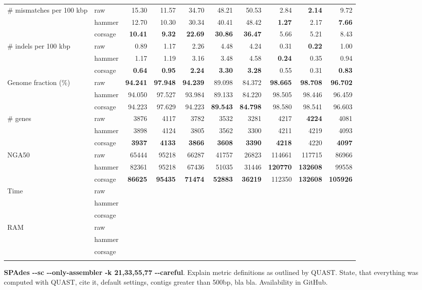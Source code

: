 \documentclass{bioinfo2}
\begin{document}
\begin{table}[p]
{\begin{tabular}{llrrrrrrrr}
\midrule
\# mismatches per 100 kbp & raw     & 15.30 & 11.57 & 34.70 & 48.21 & 50.53 & 2.84 & \textbf{2.14} & 9.72 \\
                          & hammer  & 12.70 & 10.30 & 30.34 & 40.41 & 48.42 & \textbf{1.27} & 2.17 & \textbf{7.66} \\
                          & corsage & \textbf{10.41} &  \textbf{9.32} & \textbf{22.69} & \textbf{30.86} & \textbf{36.47} & 5.66 & 5.21 & 8.43 \\
\midrule
\# indels per 100 kbp & raw     & 0.89 & 1.17 & 2.26 & 4.48 & 4.24 & 0.31 & \textbf{0.22} & 1.00 \\
                      & hammer  & 1.17 & 1.19 & 3.16 & 3.48 & 4.58 & \textbf{0.24} & 0.35 & 0.94 \\
                      & corsage & \textbf{0.64} & \textbf{0.95} & \textbf{2.24} & \textbf{3.30} & \textbf{3.28} & 0.55 & 0.31 & \textbf{0.83} \\
\midrule
Genome fraction (\%) & raw     & \textbf{94.241} & \textbf{97.948} & \textbf{94.239} & 89.098 & 84.372 & \textbf{98.665} & \textbf{98.708} & \textbf{96.702} \\
                     & hammer  & 94.050 & 97.527 & 93.984 & 89.133 & 84.220 & 98.505 & 98.446 & 96.459 \\
                     & corsage & 94.223 & 97.629 & 94.223 & \textbf{89.543} & \textbf{84.798} & 98.580 & 98.541 & 96.603 \\
\midrule
\# genes & raw     & 3876 & 4117 & 3782 & 3532 & 3281 & 4217 & \textbf{4224} & 4081 \\
         & hammer  & 3898 & 4124 & 3805 & 3562 & 3300 & 4211 & 4219 & 4093 \\
         & corsage & \textbf{3937} & \textbf{4133} & \textbf{3866} & \textbf{3608} & \textbf{3390} & \textbf{4218} & 4220 & \textbf{4097} \\
\midrule
NGA50 & raw     & 65444 & 95218 & 66287 & 41757 & 26823 & 114661 & 117715 & 86966 \\
      & hammer  & 82361 & 95218 & 67436 & 51035 & 31446 & \textbf{120770} & \textbf{132608} & 99558 \\
      & corsage & \textbf{86625} & \textbf{95435} & \textbf{71474} & \textbf{52883} & \textbf{36219} & 112350 & \textbf{132608} & \textbf{105926} \\
\midrule
Time    & raw         &  \\
        & hammer      &  \\
        & corsage     &  \\
\midrule
RAM    & raw         &  \\
       & hammer      &  \\
       & corsage     &  \\
\botrule
\end{tabular}}
{\textbf{SPAdes -{}-sc -{}-only-assembler -k 21,33,55,77 -{}-careful}. Explain metric definitions as outlined by QUAST. State, that everything was computed with QUAST, cite it, default settings, contigs greater than 500bp, bla bla. Availability in GitHub.} %
\end{table}
\end{document}
